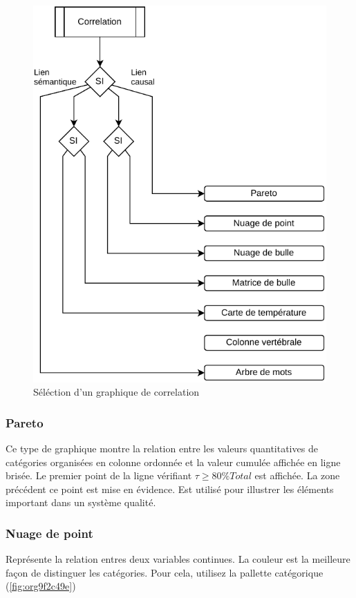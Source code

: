\documentclass[a4paper,12pt]{article}
\begin{document}
\begin{multicols}{2}
\begin{figure}[H]
\centering
\includegraphics[width=.9\linewidth]{./img/select-correlation.pdf}
\caption{\label{fig:orgc032fee}Séléction d'un graphique de correlation}
\end{figure}
\subsubsection*{Pareto}
\label{sec:org46737a5}
Ce type de graphique montre la relation entre les valeurs quantitatives de catégories organisées en colonne ordonnée et la valeur cumulée affichée en ligne brisée. Le premier point de la ligne vérifiant \(\tau\geq80\%Total\) est affichée. La zone précédent ce point est mise en évidence.
Est utilisé pour illustrer les éléments important dans un système qualité.
\subsubsection*{Nuage de point}
\label{sec:org567b89e}

Représente la relation entres deux variables continues. \autocite{alansmithLexiqueVisuel}
La couleur est la meilleure façon de distinguer les catégories.\autocite{stephenfewComponentlevelGraphDesign2012} Pour cela, utilisez la pallette catégorique (\ref{fig:org9f2c49e})


\end{multicols}
\end{document}
